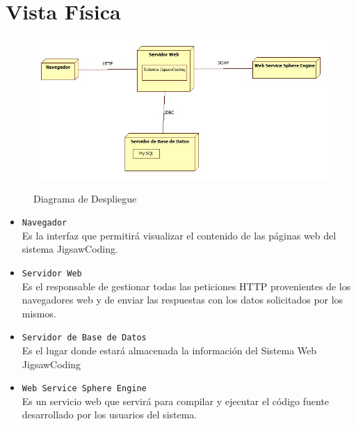 \section{Vista Física}
\begin{figure}[!h]
  \centering
  \includegraphics[scale=0.5]{figuras/sad/diagrama_de_despliegue.jpg}\\
  \caption{Diagrama de Despliegue}\label{fig:diagrama_de_despliegue}
\end{figure}
\begin{itemize}
  \item \texttt{Navegador}\\Es la interfaz que permitirá visualizar el contenido de las páginas web del sistema JigsawCoding.
  \item \texttt{Servidor Web}\\Es el responsable de gestionar todas las peticiones HTTP provenientes de los navegadores web y de enviar las respuestas con los datos solicitados por los mismos.
  \item \texttt{Servidor de Base de Datos}\\Es el lugar donde estará almacenada la información del Sistema Web JigsawCoding
  \item \texttt{Web Service Sphere Engine}\\Es un servicio web que servirá para compilar y ejecutar el código fuente desarrollado por los usuarios del sistema.
\end{itemize}
\clearpage

